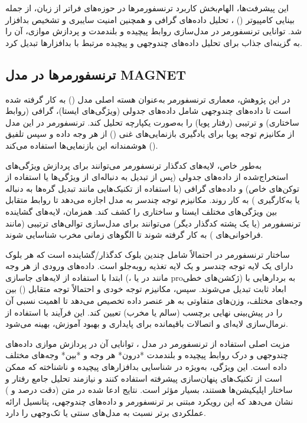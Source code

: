 این پیشرفت‌ها، الهام‌بخش کاربرد ترنسفورمرها در حوزه‌های فراتر از زبان، از جمله بینایی کامپیوتر () \cite{Dosovitskiy2021}، تحلیل داده‌های گرافی \cite{Yun2019} و همچنین امنیت سایبری و تشخیص بدافزار \cite{TransformerMalware} شد. توانایی ترنسفورمر در مدل‌سازی روابط پیچیده و بلندمدت و پردازش موازی، آن را به گزینه‌ای جذاب برای تحلیل داده‌های چندوجهی و پیچیده مرتبط با بدافزارها تبدیل کرد.

\subsection{ترنسفورمرها در مدل MAGNET}
در این پژوهش، معماری ترنسفورمر به‌عنوان هسته اصلی مدل  () به کار گرفته شده است تا داده‌های چندوجهی شامل داده‌های جدولی (ویژگی‌های ایستا)، گرافی (روابط ساختاری) و ترتیبی (رفتار پویا) را به‌صورت یکپارچه تحلیل کند. ترنسفورمر در این مدل از مکانیزم توجه پویا برای یادگیری بازنمایی‌های غنی () از هر وجه داده و سپس تلفیق () هوشمندانه این بازنمایی‌ها استفاده می‌کند.

به‌طور خاص، لایه‌های کدگذار ترنسفورمر می‌توانند برای پردازش ویژگی‌های استخراج‌شده از داده‌های جدولی (پس از تبدیل به دنباله‌ای از ویژگی‌ها یا استفاده از توکن‌های خاص) و داده‌های گرافی (با استفاده از تکنیک‌هایی مانند تبدیل گره‌ها به دنباله یا به‌کارگیری ) به کار روند. مکانیزم توجه چندسر به مدل اجازه می‌دهد تا روابط متقابل بین ویژگی‌های مختلف ایستا و ساختاری را کشف کند. همزمان، لایه‌های گشاینده ترنسفورمر (یا یک پشته کدگذار دیگر) می‌توانند برای مدل‌سازی توالی‌های ترتیبی (مانند فراخوانی‌های ) به کار گرفته شوند تا الگوهای زمانی مخرب شناسایی شوند.

ساختار ترنسفورمر در  احتمالاً شامل چندین بلوک کدگذار/گشاینده است که هر بلوک دارای یک لایه توجه چندسر و یک لایه تغذیه روبه‌جلو است. داده‌های ورودی از هر وجه ابتدا با استفاده از لایه‌های جاسازی (، مانند  در  یا proژکشن‌های خطی) به بردارهایی با ابعاد ثابت تبدیل می‌شوند. سپس، مکانیزم توجه خودی و احتمالاً توجه متقابل () بین وجه‌های مختلف، وزن‌های متفاوتی به هر عنصر داده تخصیص می‌دهد تا اهمیت نسبی آن را در پیش‌بینی نهایی برچسب (سالم یا مخرب) تعیین کند. این فرآیند با استفاده از نرمال‌سازی لایه‌ای و اتصالات باقیمانده برای پایداری و بهبود آموزش، بهینه می‌شود.

مزیت اصلی استفاده از ترنسفورمر در مدل ، توانایی آن در پردازش موازی داده‌های چندوجهی و درک روابط پیچیده و بلندمدت *درون* هر وجه و *بین* وجه‌های مختلف داده است. این ویژگی، به‌ویژه در شناسایی بدافزارهای پیچیده و ناشناخته که ممکن است از تکنیک‌های پنهان‌سازی پیشرفته استفاده کنند و نیازمند تحلیل جامع رفتار و ساختار اپلیکیشن‌ها هستند، بسیار مؤثر است. نتایج ادعا شده در متن (دقت  درصد و  ) نشان می‌دهد که این رویکرد مبتنی بر ترنسفورمر و داده‌های چندوجهی، پتانسیل ارائه عملکردی برتر نسبت به مدل‌های سنتی یا تک‌وجهی را دارد.

